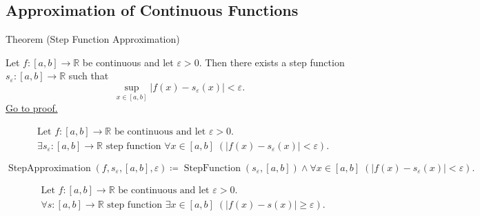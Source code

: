 
\subsection*{Approximation of Continuous Functions}
\label{sec:approximation}

\begin{theorembox}{Theorem (Step Function Approximation)}
\begin{theorem}
\label{thm:step-function-approximation}
Let $f:[a,b]\to\mathbb{R}$ be continuous and let $\varepsilon>0$.
Then there exists a step function $s_\varepsilon:[a,b]\to\mathbb{R}$ such that
\[
\sup_{x\in[a,b]} |f(x)-s_\varepsilon(x)|<\varepsilon.
\]
\hyperref[prf:step-function-approximation]{Go to proof.}
\end{theorem}
\end{theorembox}

\begin{remark*}
\[
\begin{aligned}
&\text{Let } f:[a,b]\to\mathbb{R} \text{ be continuous and let } \varepsilon>0.\\
&\exists s_\varepsilon:[a,b]\to\mathbb{R} \text{ step function } \forall x\in[a,b]\;(|f(x)-s_\varepsilon(x)|<\varepsilon).
\end{aligned}
\]
\end{remark*}

\begin{remark*}
\[
\operatorname{StepApproximation}(f,s_\varepsilon,[a,b],\varepsilon)
\coloneqq
\operatorname{StepFunction}(s_\varepsilon,[a,b])
\land
\forall x\in[a,b]\;(|f(x)-s_\varepsilon(x)|<\varepsilon).
\]
\end{remark*}

\begin{remark*}
\[
\begin{aligned}
&\text{Let } f:[a,b]\to\mathbb{R} \text{ be continuous and let } \varepsilon>0.\\
&\forall s:[a,b]\to\mathbb{R} \text{ step function } \exists x\in[a,b]\;(|f(x)-s(x)|\ge\varepsilon).
\end{aligned}
\]
\end{remark*}


